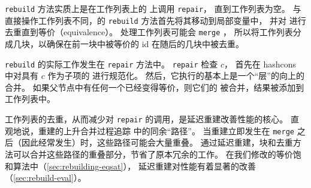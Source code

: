 \texttt{rebuild} 方法实质上是在工作列表上的 \eclasses 上调用 \texttt{repair}，
  直到工作列表为空。
与直接操作工作列表不同，\egg 的 \texttt{rebuild} 方法首先将其移动到局部变量中，
  并对 \eclasses 进行去重直到等价（equivalence）。
处理工作列表可能会 \texttt{merge} \eclasses，
  所以将工作列表分成几块，以确保在前一块中被等价的 \eclass id 在随后的几块中被去重。

\texttt{rebuild} 的实际工作发生在 \texttt{repair} 方法中。
\texttt{repair} 检查 \eclass $c$，
  首先在 hashcons 中对具有 $c$ 作为子项的 \enodes 进行规范化。
然后，它执行的基本上是一个“层”的向上的合并。
如果父节点中有任何一个已经变得等价，则它们的 \eclasses 被合并，结果被添加到工作列表中。


工作列表的去重，从而减少对 \texttt{repair} 的调用，是延迟重建改善性能的核心。
直观地说，重建的上升合并过程追踪 \egraph 中的同余``路径''。
当重建立即发生在 \texttt{merge} 之后（因此经常发生）时，这些路径可能会大量重叠。
通过延迟重建，块和去重方法可以合并这些路径的重叠部分，节省了原本冗余的工作。
在我们修改的等价饱和算法中（\autoref{sec:rebuilding-eqsat}），
  延迟重建对性能有着显著的改善（\autoref{sec:rebuild-eval}）。

